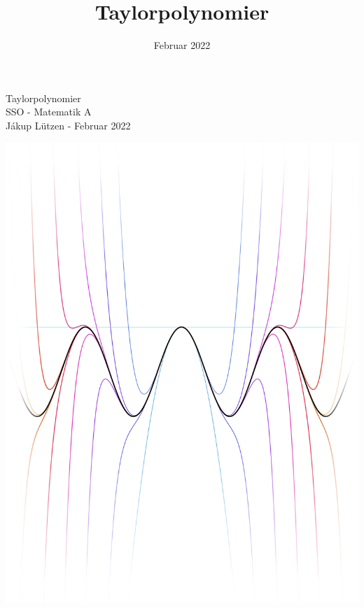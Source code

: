 \documentclass[12pt, a4paper]{article}
\title{Taylorpolynomier}
\date{Februar 2022}
\begin{document}
\begin{refsection}
\begin{titlepage}
   \centering
    \vfill
    {\huge 
    Taylorpolynomier\\
    \vspace{0.5cm}
    \large
    SSO - Matematik A\\
    \vspace{0.25cm}
    Jákup Lützen - Februar 2022
    }    
    \vfill
   
    \includegraphics[width=\textwidth]{figures/forside4edit.png} %
    \vfill
    \vfill
\thispagestyle{empty}

\end{titlepage}

\end{refsection}
\end{document}
